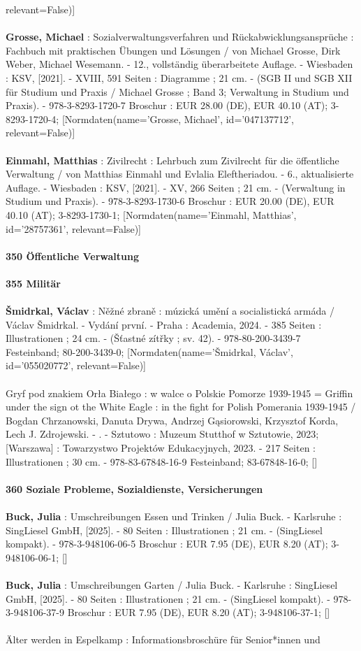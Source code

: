 \documentclass{article}
\begin{document}
\begin{multicols}{3}
relevant=False)]\\\\\textbf{Grosse, Michael} : Sozialverwaltungsverfahren und Rückabwicklungsansprüche : Fachbuch mit praktischen Übungen und Lösungen / von Michael Grosse, Dirk Weber, Michael Wesemann. - 12., vollständig überarbeitete Auflage. - Wiesbaden : KSV, [2021]. - XVIII, 591 Seiten : Diagramme ; 21 cm. - (SGB II und SGB XII für Studium und Praxis / Michael Grosse ; Band 3; Verwaltung in Studium und Praxis). - 978-3-8293-1720-7 Broschur : EUR 28.00 (DE), EUR 40.10 (AT); 3-8293-1720-4; [Normdaten(name='Grosse, Michael', id='047137712', relevant=False)]\\\\\textbf{Einmahl, Matthias} : Zivilrecht : Lehrbuch zum Zivilrecht für die öffentliche Verwaltung / von Matthias Einmahl und Evlalia Eleftheriadou. - 6., aktualisierte Auflage. - Wiesbaden : KSV, [2021]. - XV, 266 Seiten ; 21 cm. - (Verwaltung in Studium und Praxis). - 978-3-8293-1730-6 Broschur : EUR 20.00 (DE), EUR 40.10 (AT); 3-8293-1730-1; [Normdaten(name='Einmahl, Matthias', id='28757361', relevant=False)]\\\\\textbf{350 Öffentliche Verwaltung}\\\\\textbf{355 Militär}\\\\\textbf{Šmidrkal, Václav} : Něžné zbraně : múzická umění a socialistická armáda / Václav Šmidrkal. - Vydání první. - Praha : Academia, 2024. - 385 Seiten : Illustrationen ; 24 cm. - (Šťastné zítřky ; sv. 42). - 978-80-200-3439-7 Festeinband; 80-200-3439-0; [Normdaten(name='Šmidrkal, Václav', id='055020772', relevant=False)]\\\\Gryf pod znakiem Orła Białego : w walce o Polskie Pomorze 1939-1945 = Griffin under the sign ot the White Eagle : in the fight for Polish Pomerania 1939-1945 / Bogdan Chrzanowski, Danuta Drywa, Andrzej Gąsiorowski, Krzysztof Korda, Lech J. Zdrojewski. - . - Sztutowo : Muzeum Stutthof w Sztutowie, 2023; [Warszawa] : Towarzystwo Projektów Edukacyjnych, 2023. - 217 Seiten : Illustrationen ; 30 cm. - 978-83-67848-16-9 Festeinband; 83-67848-16-0; []\\\\\textbf{360 Soziale Probleme, Sozialdienste, Versicherungen}\\\\\textbf{Buck, Julia} : Umschreibungen Essen und Trinken / Julia Buck. - Karlsruhe : SingLiesel GmbH, [2025]. - 80 Seiten : Illustrationen ; 21 cm. - (SingLiesel kompakt). - 978-3-948106-06-5 Broschur : EUR 7.95 (DE), EUR 8.20 (AT); 3-948106-06-1; []\\\\\textbf{Buck, Julia} : Umschreibungen Garten / Julia Buck. - Karlsruhe : SingLiesel GmbH, [2025]. - 80 Seiten : Illustrationen ; 21 cm. - (SingLiesel kompakt). - 978-3-948106-37-9 Broschur : EUR 7.95 (DE), EUR 8.20 (AT); 3-948106-37-1; []\\\\Älter werden in Espelkamp : Informationsbroschüre für Senior*innen und 
\end{multicols}
\end{document}
